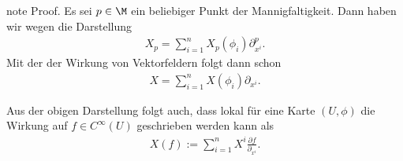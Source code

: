 \documentclass[letterpaper,10pt,english]{jupyterBook}
\begin{document}
\begin{sphinxadmonition}{note}
\sphinxAtStartPar
Proof. Es sei \(p\in\M\) ein beliebiger Punkt der Mannigfaltigkeit.
Dann haben wir wegen {\hyperref[\detokenize{manifolds/tangential:thm:tanbasis}]{}} die Darstellung
\begin{equation*}
\begin{split}X_p = \sum_{i=1}^n X_p(\phi_i) \partial_{x^i}^p.\end{split}
\end{equation*}
\sphinxAtStartPar
Mit der {\hyperref[\detokenize{manifolds/tangential:def:wirkung}]{}} der Wirkung von Vektorfeldern folgt dann schon
\begin{equation*}
\begin{split}X = \sum_{i=1}^n X(\phi_i) \partial_{x^i}.\end{split}
\end{equation*}\end{sphinxadmonition}

\sphinxAtStartPar
Aus der obigen Darstellung folgt auch, dass lokal für eine Karte \((U,\phi)\) die Wirkung auf \(f\in C^\infty(U)\) geschrieben werden kann als
\begin{equation*}
\begin{split}X(f) := \sum_{i=1}^n X^i \frac{\partial f}{\partial_{x^i}}.\end{split}
\end{equation*}
\end{document}
